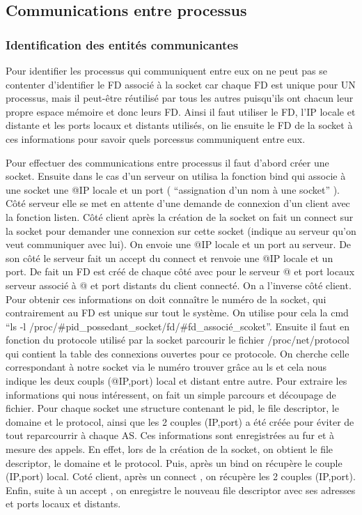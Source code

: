 \documentclass{article}
\begin{document}
\subsection{Communications entre processus}
\subsubsection{Identification des entités communicantes}
Pour identifier les processus qui communiquent entre eux on ne peut
pas se contenter d'identifier le FD associé à la socket car chaque FD
est unique pour UN processus, mais il peut-être réutilisé par tous les
autres puisqu'ils ont chacun leur propre espace mémoire et donc leurs
FD. Ainsi il faut utiliser le FD, l'IP locale et distante et les ports
locaux et distants utilisés, on lie ensuite le FD de la socket à ces
informations pour savoir quels porcessus communiquent entre eux.

Pour effectuer des communications entre processus il faut d'abord
créer une socket. Ensuite dans le cas d'un serveur on utilisa la
fonction bind qui associe à une socket une @IP locale et un port (
``assignation d'un nom à une socket'' ). Côté serveur elle se met en
attente d'une demande de connexion d'un client avec la fonction
listen. Côté client après la création de la socket on fait un connect
sur la socket pour demander une connexion sur cette socket (indique au
serveur qu'on veut communiquer avec lui). On envoie une @IP locale et
un port au serveur. De son côté le serveur fait un accept du connect
et renvoie une @IP locale et un port. De fait un FD est créé de chaque
côté avec pour le serveur @ et port locaux serveur associé à @ et port
distants du client connecté. On a l'inverse côté client. Pour obtenir
ces informations on doit connaître le numéro de la socket, qui
contrairement au FD est unique sur tout le système. On utilise pour
cela la cmd ``ls -l
/proc/\#pid\_possedant\_socket/fd/\#fd\_associé\_scoket''. Ensuite il
faut en fonction du protocole utilisé par la socket parcourir le
fichier /proc/net/protocol qui contient la table des connexions
ouvertes pour ce protocole. On cherche celle correspondant à notre
socket via le numéro trouver grâce au ls et cela nous indique les deux
coupls (@IP,port) local et distant entre autre. Pour extraire les
informations qui nous intéressent, on fait un simple parcours et
découpage de fichier. Pour chaque socket une structure contenant le
pid, le file descriptor, le domaine et le protocol, ainsi que les 2
couples (IP,port) a été créée pour éviter de tout reparcourrir à
chaque AS. Ces informations sont enregistrées au fur et à mesure des
appels. En effet, lors de la création de la socket, on obtient le file
descriptor, le domaine et le protocol. Puis, après un bind on récupère
le couple (IP,port) local. Coté client, après un connect , on récupère
les 2 couples (IP,port). Enfin, suite à un accept , on enregistre le
nouveau file descriptor avec ses adresses et ports locaux et distants.
\end{document}
